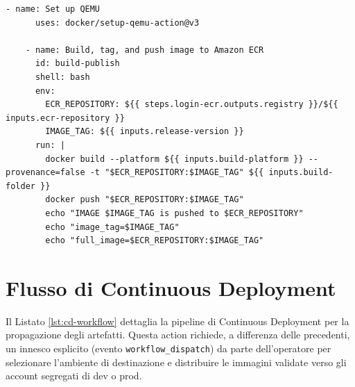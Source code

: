 \begin{lstlisting}[label={lst:ecr-composite-action}]
    - name: Set up QEMU
      uses: docker/setup-qemu-action@v3
      
    - name: Build, tag, and push image to Amazon ECR
      id: build-publish
      shell: bash
      env:
        ECR_REPOSITORY: ${{ steps.login-ecr.outputs.registry }}/${{ inputs.ecr-repository }}
        IMAGE_TAG: ${{ inputs.release-version }}
      run: |
        docker build --platform ${{ inputs.build-platform }} --provenance=false -t "$ECR_REPOSITORY:$IMAGE_TAG" ${{ inputs.build-folder }}
        docker push "$ECR_REPOSITORY:$IMAGE_TAG"
        echo "IMAGE $IMAGE_TAG is pushed to $ECR_REPOSITORY"
        echo "image_tag=$IMAGE_TAG" 
        echo "full_image=$ECR_REPOSITORY:$IMAGE_TAG"
\end{lstlisting}


\section{Flusso di Continuous Deployment}
Il Listato \ref{lst:cd-workflow} dettaglia la pipeline di Continuous Deployment per la propagazione degli artefatti. Questa action richiede, a differenza delle precedenti, un innesco esplicito (evento \texttt{workflow\_dispatch}) da parte dell'operatore per selezionare l'ambiente di destinazione e distribuire le immagini validate verso gli account segregati di dev o prod.

